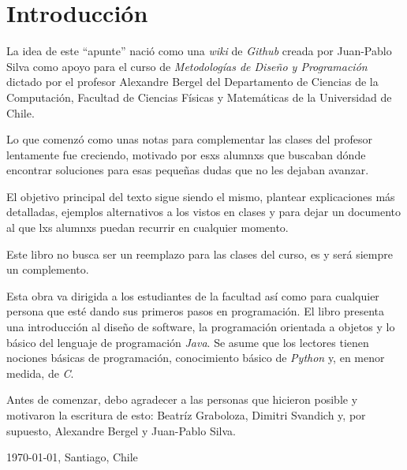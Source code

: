 \chapter*{Introducción}
  La idea de este \enquote{apunte} nació como una \textit{wiki} de \textit{Github} creada por 
  Juan-Pablo Silva como apoyo para el curso de \textit{Metodologías de Diseño y Programación} 
  dictado por el profesor Alexandre Bergel del Departamento de Ciencias de la Computación, Facultad
  de Ciencias Físicas y Matemáticas de la Universidad de Chile.

  Lo que comenzó como unas notas para complementar las clases del profesor lentamente fue creciendo,
  motivado por esxs alumnxs que buscaban dónde encontrar soluciones para esas pequeñas dudas que no
  les dejaban avanzar.

  El objetivo principal del texto sigue siendo el mismo, plantear explicaciones más detalladas, 
  ejemplos alternativos a los vistos en clases y para dejar un documento al que lxs alumnxs puedan
  recurrir en cualquier momento.

  Este libro no busca ser un reemplazo para las clases del curso, es y será siempre un complemento.

  Esta obra va dirigida a los estudiantes de la facultad así como para cualquier persona que esté
  dando sus primeros pasos en programación.
  El libro presenta una introducción al diseño de software, la programación orientada a objetos y lo
  básico del lenguaje de programación \textit{Java}.
  Se asume que los lectores tienen nociones básicas de programación, conocimiento básico de 
  \textit{Python} y, en menor medida, de \textit{C}.

  Antes de comenzar, debo agradecer a las personas que hicieron posible y motivaron la escritura de
  esto: Beatríz Graboloza, Dimitri Svandich y, por supuesto, Alexandre Bergel y Juan-Pablo Silva.

  \begin{center}
    \today, Santiago, Chile
  \end{center}